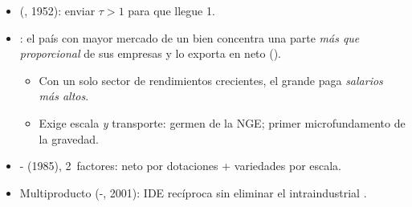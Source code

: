\documentclass{article}
\begin{document}
\begin{columnas}
\begin{itemize}
\item {} (, 1952): enviar $\tau>1$ para que llegue 1.
\item {}: el país con mayor mercado de un bien concentra una parte \emph{más que proporcional} de sus empresas y lo exporta en neto ().
  \begin{itemize}
  \item Con un solo sector de rendimientos crecientes, el grande paga \emph{salarios más altos}.
  \item Exige escala \emph{y} transporte: germen de la NGE; primer microfundamento de la gravedad.
  \end{itemize}
\item {}- (1985), 2~factores: neto por dotaciones + variedades por escala.
\item Multiproducto (-, 2001): IDE recíproca sin eliminar el intraindustrial .
\end{itemize}


\end{columnas}
\end{document}
